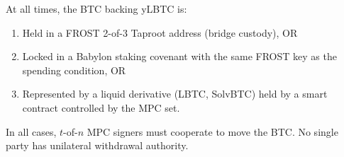 \begin{property}
At all times, the BTC backing yLBTC is:
\begin{enumerate}[nosep]
  \item Held in a FROST 2-of-3 Taproot address (bridge custody), OR
  \item Locked in a Babylon staking covenant with the same FROST key as the spending condition, OR
  \item Represented by a liquid derivative (LBTC, SolvBTC) held by a smart contract controlled by the MPC set.
\end{enumerate}
In all cases, $t$-of-$n$ MPC signers must cooperate to move the BTC. No single party has unilateral withdrawal authority.
\end{property}

